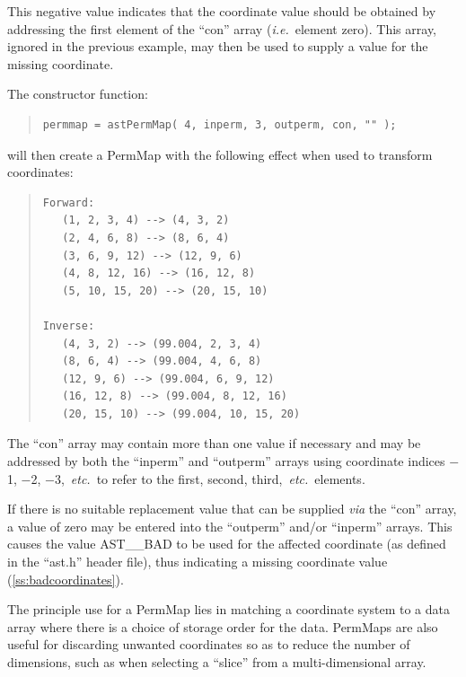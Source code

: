 \documentclass[twoside,11pt]{article}
\newcommand{\secref}[1]{\S\ref{#1}}
\renewcommand{\secref}[1]{\ref{#1}}
\begin{document}
This negative value indicates that the coordinate value should be
obtained by addressing the first element of the ``con'' array
({\em{i.e.}}\ element zero). This array, ignored in the previous
example, may then be used to supply a value for the missing
coordinate.

The constructor function:

\begin{quote}
\small
\begin{verbatim}
permmap = astPermMap( 4, inperm, 3, outperm, con, "" );
\end{verbatim}
\normalsize
\end{quote}

will then create a PermMap with the following effect when used to
transform coordinates:

\begin{quote}
\begin{verbatim}
Forward:
   (1, 2, 3, 4) --> (4, 3, 2)
   (2, 4, 6, 8) --> (8, 6, 4)
   (3, 6, 9, 12) --> (12, 9, 6)
   (4, 8, 12, 16) --> (16, 12, 8)
   (5, 10, 15, 20) --> (20, 15, 10)

Inverse:
   (4, 3, 2) --> (99.004, 2, 3, 4)
   (8, 6, 4) --> (99.004, 4, 6, 8)
   (12, 9, 6) --> (99.004, 6, 9, 12)
   (16, 12, 8) --> (99.004, 8, 12, 16)
   (20, 15, 10) --> (99.004, 10, 15, 20)
\end{verbatim}
\end{quote}

The ``con'' array may contain more than one value if necessary and may
be addressed by both the ``inperm'' and ``outperm'' arrays using
coordinate indices $-$1, $-$2, $-$3,~{\em{etc.}}\ to refer to the
first, second, third,~{\em{etc.}}\ elements.

If there is no suitable replacement value that can be supplied
{\em{via}} the ``con'' array, a value of zero may be entered into the
``outperm'' and/or ``inperm'' arrays. This causes the value AST\_\_BAD
to be used for the affected coordinate (as defined in the ``ast.h''
header file), thus indicating a missing coordinate value
(\secref{ss:badcoordinates}).

The principle use for a PermMap lies in matching a coordinate system
to a data array where there is a choice of storage order for the data.
PermMaps are also useful for discarding unwanted coordinates so as to
reduce the number of dimensions, such as when selecting a ``slice''
from a multi-dimensional array.

\cleardoublepage
%
\end{document}
